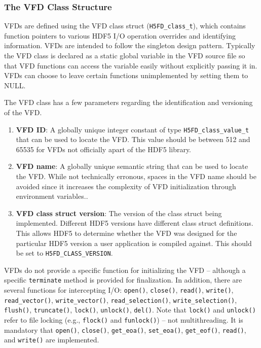 \subsubsection{The VFD Class Structure}

VFDs are defined using the VFD class struct (\texttt{H5FD\_class\_t}), which contains function pointers to various HDF5 I/O operation overrides and identifying information. VFDs are intended to follow the singleton design pattern. Typically the VFD class is declared as a static global variable in the VFD source file so that VFD functions can access the variable easily without explicitly passing it in. VFDs can choose to leave certain functions unimplemented by setting them to NULL.

The VFD class has a few parameters regarding the identification and versioning of the VFD.
\begin{enumerate}
    \item \textbf{VFD ID}: A globally unique integer constant of type \texttt{H5FD\_class\_value\_t} that can be used to locate the VFD. This value should be between 512 and 65535 for VFDs not officially apart of the HDF5 library.
    \item \textbf{VFD name}: A globally unique semantic string that can be used to locate the VFD. While not technically erronous, spaces in the VFD name should be avoided since it increases the complexity of VFD initialization through environment variables..
    \item \textbf{VFD class struct version}: The version of the class struct being implemented. Different HDF5 versions have different class struct definitions. This allows HDF5 to determine whether the VFD was designed for the particular HDF5 version a user application is compiled against. This should be set to \texttt{H5FD\_CLASS\_VERSION}.
\end{enumerate}

VFDs do not provide a specific function for initializing the VFD -- although a specific \texttt{terminate} method is provided for finalization. In addition, there are several functions for intercepting I/O: \texttt{open()}, \texttt{close()}, \texttt{read()}, \texttt{write()}, \texttt{read\_vector()}, \texttt{write\_vector()}, \texttt{read\_selection()}, \texttt{write\_selection()}, \texttt{flush()}, \texttt{truncate()}, \texttt{lock()}, \texttt{unlock()}, \texttt{del()}. Note that \texttt{lock()} and \texttt{unlock()} refer to file locking (e.g., \texttt{flock()} and \texttt{funlock()}) -- not multithreading. It is mandatory that \texttt{open()}, \texttt{close()}, \texttt{get\_eoa()}, \texttt{set\_eoa()}, \texttt{get\_eof()}, \texttt{read()}, and \texttt{write()} are implemented.

